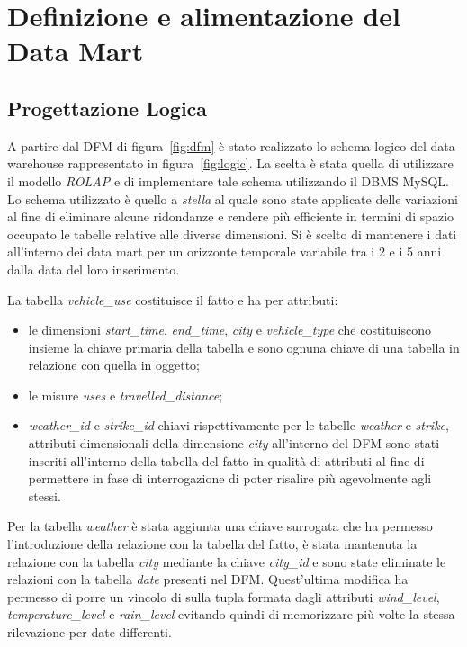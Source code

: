 \chapter{Definizione e alimentazione del Data Mart}

\section{Progettazione Logica}

A partire dal DFM di figura~\ref{fig:dfm} è stato realizzato lo schema
logico del data warehouse rappresentato in figura~\ref{fig:logic}.
La scelta è stata quella di utilizzare il modello \textit{ROLAP} e di
implementare tale schema utilizzando il DBMS MySQL.
Lo schema utilizzato è quello a \textit{stella} al quale sono state applicate
delle variazioni al fine di eliminare alcune ridondanze e rendere più efficiente
in termini di spazio occupato le tabelle relative alle diverse dimensioni.
Si è scelto di mantenere i dati all'interno dei data mart per un orizzonte
temporale variabile tra i 2 e i 5 anni dalla data del loro inserimento.

La tabella \textit{vehicle\_use} costituisce il fatto e ha per attributi:
\begin{itemize}
\item le dimensioni \textit{start\_time}, \textit{end\_time}, \textit{city} e
\textit{vehicle\_type} che costituiscono insieme la chiave primaria della
tabella e sono ognuna chiave di una tabella in relazione con quella in oggetto;
\item le misure \textit{uses} e \textit{travelled\_distance};
\item \textit{weather\_id} e \textit{strike\_id} chiavi rispettivamente per
le tabelle \textit{weather} e \textit{strike}, attributi dimensionali della
dimensione \textit{city} all'interno del DFM sono stati inseriti all'interno
della tabella del fatto in qualità di attributi al fine di permettere in
fase di interrogazione di poter risalire più agevolmente agli stessi.
\end{itemize}

Per la tabella \textit{weather} è stata aggiunta una chiave surrogata che ha
permesso l'introduzione della relazione con la tabella del fatto, è stata
mantenuta la relazione con la tabella \textit{city} mediante la chiave
\textit{city\_id} e sono state eliminate le relazioni con la tabella
\textit{date} presenti nel DFM. Quest'ultima modifica ha permesso di
porre un vincolo di  sulla tupla formata dagli attributi
\textit{wind\_level}, \textit{temperature\_level} e \textit{rain\_level}
evitando quindi di memorizzare più volte la stessa rilevazione per date
differenti.

